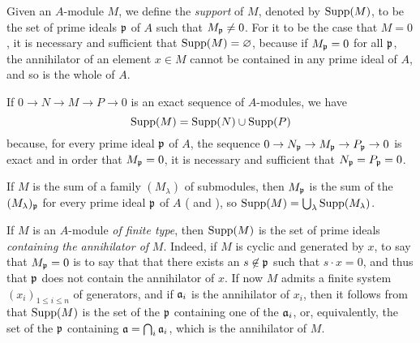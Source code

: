\begin{env}[1.7.1]
\label{0.1.7.1}
Given an $A$-module $M$, we define the {\em support} of $M$, denoted by
${\mathop{\mathrm{Supp}}\nolimits}(M)$, to be the set of prime ideals $\mathfrak{p}$ of $A$ such that
$M_\mathfrak{p}\neq 0$. For it to be the case that $M=0$, it is necessary and sufficient
that ${\mathop{\mathrm{Supp}}\nolimits}(M)=\varnothing$, because if $M_\mathfrak{p}=0$ for all $\mathfrak{p}$, the
annihilator of an element $x\in M$ cannot be contained in any prime ideal of
$A$, and so is the whole of $A$.
\end{env}

\begin{env}[1.7.2]
\label{0.1.7.2}
If $0\to N\to M\to P\to 0$ is an exact sequence of $A$-modules, we have
\[
  {\mathop{\mathrm{Supp}}\nolimits}(M)={\mathop{\mathrm{Supp}}\nolimits}(N)\cup{\mathop{\mathrm{Supp}}\nolimits}(P)
\]
because, for every prime ideal $\mathfrak{p}$ of $A$, the sequence
$0\to N_\mathfrak{p}\to M_\mathfrak{p}\to P_\mathfrak{p}\to 0$ is exact
 and in order that $M_\mathfrak{p}=0$, it is necessary and sufficient
that $N_\mathfrak{p}=P_\mathfrak{p}=0$.
\end{env}

\begin{env}[1.7.3]
\label{0.1.7.3}
If $M$ is the sum of a family $(M_\lambda)$ of submodules, then $M_\mathfrak{p}$
is the sum of the $(M_\lambda)_\mathfrak{p}$ for every prime ideal
$\mathfrak{p}$ of $A$ ( and ),
so ${\mathop{\mathrm{Supp}}\nolimits}(M)=\bigcup_\lambda{\mathop{\mathrm{Supp}}\nolimits}(M_\lambda)$.
\end{env}

\begin{env}[1.7.4]
\label{0.1.7.4}
If $M$ is an $A$-module {\em of finite type}, then ${\mathop{\mathrm{Supp}}\nolimits}(M)$ is the set of prime
ideals {\em containing the annihilator of} $M$. Indeed, if $M$ is cyclic and
generated by $x$, to say that $M_\mathfrak{p}=0$ is to say that that there exists an
$s\not\in\mathfrak{p}$ such that $s\cdot x=0$, and thus that $\mathfrak{p}$ does not
contain the annihilator of $x$. If now $M$ admits a finite system
$(x_i)_{1\leqslant i\leqslant n}$ of generators, and if $\mathfrak{a}_i$ is the
annihilator of $x_i$, then it follows from  that ${\mathop{\mathrm{Supp}}\nolimits}(M)$ is
the set of the $\mathfrak{p}$ containing one of the $\mathfrak{a}_i$, or,
equivalently, the set of the $\mathfrak{p}$ containing
$\mathfrak{a}=\bigcap_i\mathfrak{a}_i$, which is the annihilator of $M$.
\end{env}

